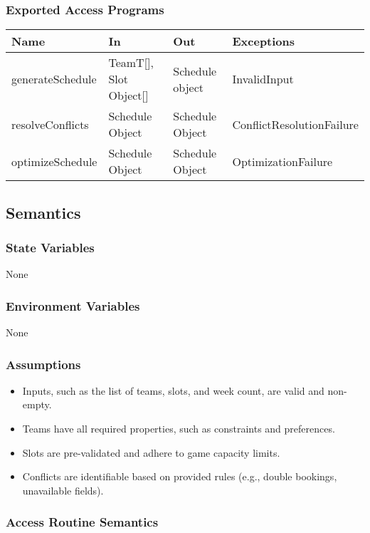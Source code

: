 \documentclass[12pt, titlepage]{article}
\begin{document}
\subsubsection{Exported Access Programs}

\begin{center}
  \begin{tabular}{|p{3cm}|p{3.5cm}|p{3.5cm}|p{5cm}|}
  \hline
  Name & In & Out & Exceptions \\
  \hline
  generateSchedule & TeamT[], Slot Object[] & Schedule object & InvalidInput \\
  resolveConflicts & Schedule Object & Schedule Object & ConflictResolutionFailure \\
  optimizeSchedule & Schedule Object & Schedule Object & OptimizationFailure \\
  \hline
  \end{tabular}
\end{center}

\subsection{Semantics}

\subsubsection{State Variables}
None

\subsubsection{Environment Variables}
None

\subsubsection{Assumptions}
\begin{itemize}
  \item Inputs, such as the list of teams, slots, and week count, are valid and non-empty.
  \item Teams have all required properties, such as constraints and preferences.
  \item Slots are pre-validated and adhere to game capacity limits.
  \item Conflicts are identifiable based on provided rules (e.g., double bookings, unavailable fields).
\end{itemize}

\subsubsection{Access Routine Semantics}
\end{document}
